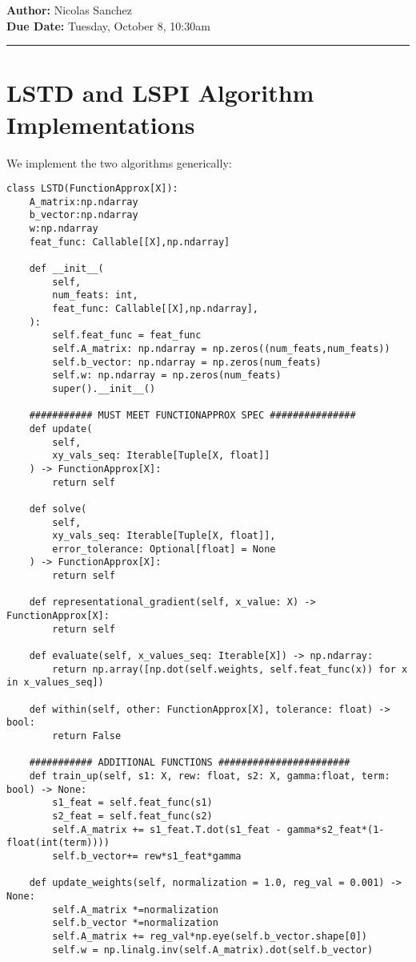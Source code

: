 \documentclass{article}[12pt]
\newcommand{\headings}[4]{\noindent {\bf Assignment 14 CME241} \hfill {{\bf Author:} Nicolas Sanchez} \\
{} \hfill {{\bf Due Date:} #2} \\

\rule[0.1in]{\textwidth}{0.025in}
}
\begin{document}
\headings{\#1}{Tuesday, October 8, 10:30am}\section{} 



\section{LSTD and LSPI Algorithm Implementations}
We implement the two algorithms generically:

\begin{lstlisting}
class LSTD(FunctionApprox[X]):
    A_matrix:np.ndarray
    b_vector:np.ndarray
    w:np.ndarray
    feat_func: Callable[[X],np.ndarray]

    def __init__(
        self,
        num_feats: int,
        feat_func: Callable[[X],np.ndarray],
    ):
        self.feat_func = feat_func
        self.A_matrix: np.ndarray = np.zeros((num_feats,num_feats))
        self.b_vector: np.ndarray = np.zeros(num_feats)
        self.w: np.ndarray = np.zeros(num_feats)
        super().__init__()

    ########### MUST MEET FUNCTIONAPPROX SPEC ###############
    def update(
        self,
        xy_vals_seq: Iterable[Tuple[X, float]]
    ) -> FunctionApprox[X]:
        return self

    def solve(
        self,
        xy_vals_seq: Iterable[Tuple[X, float]],
        error_tolerance: Optional[float] = None
    ) -> FunctionApprox[X]:
        return self

    def representational_gradient(self, x_value: X) -> FunctionApprox[X]:
        return self

    def evaluate(self, x_values_seq: Iterable[X]) -> np.ndarray:
        return np.array([np.dot(self.weights, self.feat_func(x)) for x in x_values_seq])

    def within(self, other: FunctionApprox[X], tolerance: float) -> bool:
        return False

    ########### ADDITIONAL FUNCTIONS #######################
    def train_up(self, s1: X, rew: float, s2: X, gamma:float, term: bool) -> None:
        s1_feat = self.feat_func(s1)
        s2_feat = self.feat_func(s2)
        self.A_matrix += s1_feat.T.dot(s1_feat - gamma*s2_feat*(1-float(int(term))))
        self.b_vector+= rew*s1_feat*gamma

    def update_weights(self, normalization = 1.0, reg_val = 0.001) -> None:
        self.A_matrix *=normalization 
        self.b_vector *=normalization
        self.A_matrix += reg_val*np.eye(self.b_vector.shape[0])
        self.w = np.linalg.inv(self.A_matrix).dot(self.b_vector)


\end{lstlisting}
\end{document}
